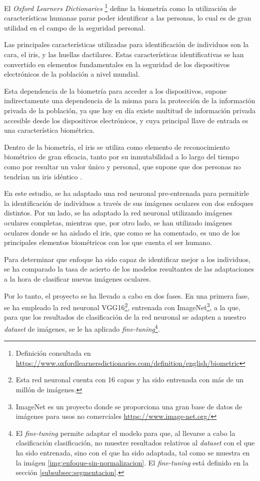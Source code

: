  \label{capitulo1}

El \textit{Oxford Learners Dictionaries} \footnote{Definición consultada en \url{https://www.oxfordlearnersdictionaries.com/definition/english/biometric}} define la biometría como la utilización de características humanas parar poder identificar a las personas, lo cual es de gran utilidad en el campo de la seguridad personal.

Las principales características utilizadas para identificación de individuos son la cara, el iris, y las huellas dactilares. Estas características identificativas se han convertido en elementos fundamentales en la seguridad de los dispositivos electrónicos de la población a nivel mundial. 

Esta dependencia de la biometría para acceder a los dispositivos, supone indirectamente una dependencia de la misma para la protección de la información privada de la población, ya que hoy en día existe multitud de información privada accesible desde los dispositivos electrónicos, y cuya principal llave de entrada es una característica biométrica.

Dentro de la biometría, el iris se utiliza como elemento de reconocimiento biométrico de gran eficacia, tanto por su inmutabilidad a lo largo del tiempo como por resultar un valor único y 
personal, que supone que dos personas no tendrían un iris idéntico \cite{malgheet_iris_2021}. 

En este estudio, se ha adaptado una red neuronal pre-entrenada para permitirle la identificación de individuos a través de sus imágenes oculares con dos enfoques distintos. Por un lado, se ha adaptado la red neuronal utilizando imágenes oculares completas, mientras que, por otro lado, 
se han utilizado imágenes oculares donde se ha aislado el iris, que como se ha comentado, es uno de los principales elementos biométricos con los que cuenta el ser humano.


Para determinar que enfoque ha sido capaz de identificar mejor a los individuos, se ha comparado la tasa de acierto de los modelos resultantes de las adaptaciones a la hora de clasificar nuevas imágenes oculares. 

Por lo tanto, el proyecto se ha llevado a cabo en dos fases. En una primera fase, se ha empleado la red neuronal VGG16\footnote{Esta red neuronal cuenta con 16 capas y ha sido entrenada con más de un millón de imágenes.}, entrenada con ImageNet\footnote{ImageNet es un proyecto donde se proporciona 
una gran base de datos de imágenes para usos no comerciales \url{https://www.image-net.org/}}, a la que, para que los resultados de clasificación de la red neuronal se adapten a nuestro \textit{dataset} de imágenes, se le ha aplicado \textit{fine-tuning}\footnote{El \textit{fine-tuning} 
permite adaptar el modelo para que, al llevarse a cabo la clasificación clasificación, no muestre resultados relativos al \textit{dataset} con el que ha sido entrenada, sino con el que ha sido adaptada, tal como se muestra en la imágen \ref{img:enfoque-sin-normalizacion}. El \textit{fine-tuning} está definido en la sección \ref{subsubsec:segmentacion}.}.

